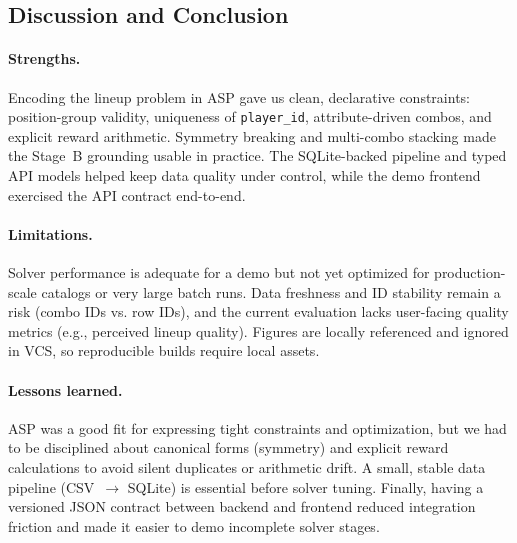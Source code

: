 \subsection{Discussion and Conclusion}

\paragraph{Strengths.} Encoding the lineup problem in ASP gave us clean, declarative constraints: position-group validity, uniqueness of \texttt{player\_id}, attribute-driven combos, and explicit reward arithmetic. Symmetry breaking and multi-combo stacking made the Stage~B grounding usable in practice. The SQLite-backed pipeline and typed API models helped keep data quality under control, while the demo frontend exercised the API contract end-to-end.

\paragraph{Limitations.} Solver performance is adequate for a demo but not yet optimized for production-scale catalogs or very large batch runs. Data freshness and ID stability remain a risk (combo IDs vs. row IDs), and the current evaluation lacks user-facing quality metrics (e.g., perceived lineup quality). Figures are locally referenced and ignored in VCS, so reproducible builds require local assets.

\paragraph{Lessons learned.} ASP was a good fit for expressing tight constraints and optimization, but we had to be disciplined about canonical forms (symmetry) and explicit reward calculations to avoid silent duplicates or arithmetic drift. A small, stable data pipeline (CSV~$\rightarrow$ SQLite) is essential before solver tuning. Finally, having a versioned JSON contract between backend and frontend reduced integration friction and made it easier to demo incomplete solver stages.
